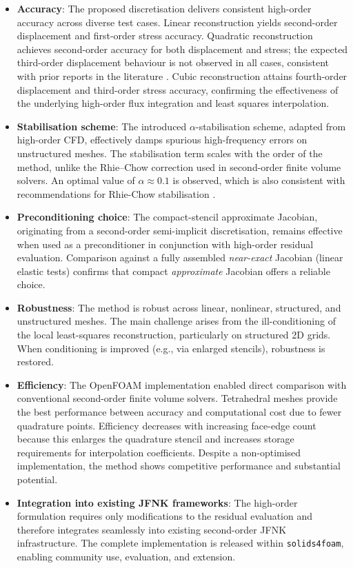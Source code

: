 \documentclass[review,3p]{elsarticle}
\begin{document}
\begin{itemize}
	\item \textbf{Accuracy}: The proposed discretisation delivers consistent high-order accuracy across diverse test cases. Linear reconstruction yields second-order displacement and first-order stress accuracy. Quadratic reconstruction achieves second-order accuracy for both displacement and stress; the expected third-order displacement behaviour is not observed in all cases, consistent with prior reports in the literature \cite{Nishikawa2025a}. Cubic reconstruction attains fourth-order displacement and third-order stress accuracy, confirming the effectiveness of the underlying high-order flux integration and least squares interpolation.
	\item \textbf{Stabilisation scheme}: The introduced $\alpha$-stabilisation scheme, adapted from high-order CFD, effectively damps spurious high-frequency errors on unstructured meshes. The stabilisation term scales with the order of the method, unlike the Rhie–Chow correction used in second-order finite volume solvers. An optimal value of $\alpha \approx 0.1$ is observed, which is also consistent with recommendations for Rhie-Chow stabilisation \cite{Cardiff2025}.
	\item \textbf{Preconditioning choice}: The compact-stencil approximate Jacobian, originating from a second-order semi-implicit discretisation, remains effective when used as a preconditioner in conjunction with high-order residual evaluation. Comparison against a fully assembled \emph{near-exact} Jacobian (linear elastic tests) confirms that compact \emph{approximate} Jacobian offers a reliable choice.
	\item \textbf{Robustness}:
	The method is robust across linear, nonlinear, structured, and unstructured meshes. The main challenge arises from the ill-conditioning of the local least-squares reconstruction, particularly on structured 2D grids. When conditioning is improved (e.g., via enlarged stencils), robustness is restored.
	\item \textbf{Efficiency}: The OpenFOAM implementation enabled direct comparison with conventional second-order finite volume solvers. Tetrahedral meshes provide the best performance between accuracy and computational cost due to fewer quadrature points. Efficiency decreases with increasing face-edge count because this enlarges the quadrature stencil and increases storage requirements for interpolation coefficients. Despite a non-optimised implementation, the method shows competitive performance and substantial potential.
	\item \textbf{Integration into existing JFNK frameworks}: The high-order formulation requires only modifications to the residual evaluation and therefore integrates seamlessly into existing second-order JFNK infrastructure. The complete implementation is released within \texttt{solids4foam}, enabling community use, evaluation, and extension.
\end{itemize}
\end{document}

